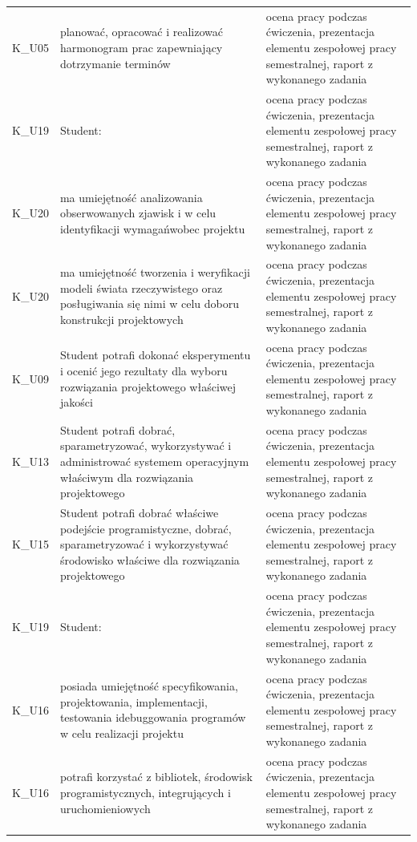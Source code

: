 \documentclass[12pt, a4paper]{article}
\begin{document}
{\begin{longtable}{m{1.6cm}m{9.0cm}m{4.2cm}}
  \rowcolor{tableRowAlt} K\_U05 & planować, opracować i realizować harmonogram prac zapewniający dotrzymanie terminów & ocena pracy podczas ćwiczenia, prezentacja elementu zespołowej pracy semestralnej, raport z wykonanego zadania \\
  \rowcolor{tableRowLight} K\_U19 & Student: & ocena pracy podczas ćwiczenia, prezentacja elementu zespołowej pracy semestralnej, raport z wykonanego zadania \\
  \rowcolor{tableRowAlt} K\_U20 & ma umiejętność analizowania obserwowanych zjawisk i w celu identyfikacji wymagańwobec projektu & ocena pracy podczas ćwiczenia, prezentacja elementu zespołowej pracy semestralnej, raport z wykonanego zadania \\
  \rowcolor{tableRowLight} K\_U20 & ma umiejętność tworzenia i weryfikacji modeli świata rzeczywistego oraz posługiwania się nimi w celu doboru konstrukcji projektowych & ocena pracy podczas ćwiczenia, prezentacja elementu zespołowej pracy semestralnej, raport z wykonanego zadania \\
  \rowcolor{tableRowAlt} K\_U09 & Student potrafi dokonać eksperymentu i ocenić jego rezultaty dla wyboru rozwiązania projektowego właściwej jakości & ocena pracy podczas ćwiczenia, prezentacja elementu zespołowej pracy semestralnej, raport z wykonanego zadania \\
  \rowcolor{tableRowLight} K\_U13 & Student potrafi dobrać, sparametryzować, wykorzystywać i administrować systemem operacyjnym właściwym dla rozwiązania projektowego & ocena pracy podczas ćwiczenia, prezentacja elementu zespołowej pracy semestralnej, raport z wykonanego zadania \\
  \rowcolor{tableRowAlt} K\_U15 & Student potrafi dobrać właściwe podejście programistyczne, dobrać, sparametryzować i wykorzystywać środowisko właściwe dla rozwiązania projektowego & ocena pracy podczas ćwiczenia, prezentacja elementu zespołowej pracy semestralnej, raport z wykonanego zadania \\
  \rowcolor{tableRowLight} K\_U19 & Student: & ocena pracy podczas ćwiczenia, prezentacja elementu zespołowej pracy semestralnej, raport z wykonanego zadania \\
  \rowcolor{tableRowAlt} K\_U16 & posiada umiejętność specyfikowania, projektowania, implementacji, testowania idebuggowania programów w celu realizacji projektu & ocena pracy podczas ćwiczenia, prezentacja elementu zespołowej pracy semestralnej, raport z wykonanego zadania \\
  \rowcolor{tableRowLight} K\_U16 & potrafi korzystać z bibliotek, środowisk programistycznych, integrujących i uruchomieniowych & ocena pracy podczas ćwiczenia, prezentacja elementu zespołowej pracy semestralnej, raport z wykonanego zadania \\

\end{longtable}}
\end{document}
